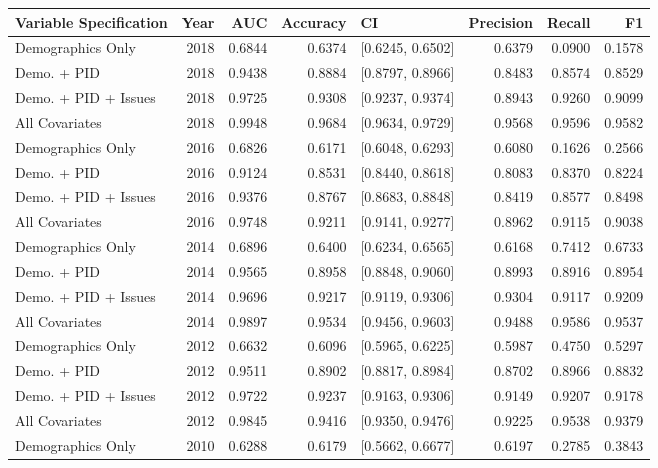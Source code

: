\begin{table}[ht]
\centering
\begin{tabular}{lrrrlrrr}
  \toprule
Variable Specification & Year & AUC & Accuracy & CI & Precision & Recall & F1 \\ 
  \midrule
Demographics Only & 2018 & 0.6844 & 0.6374 & [0.6245, 0.6502] & 0.6379 & 0.0900 & 0.1578 \\ 
  Demo. + PID & 2018 & 0.9438 & 0.8884 & [0.8797, 0.8966] & 0.8483 & 0.8574 & 0.8529 \\ 
  Demo. + PID + Issues & 2018 & 0.9725 & 0.9308 & [0.9237, 0.9374] & 0.8943 & 0.9260 & 0.9099 \\ 
  All Covariates & 2018 & 0.9948 & 0.9684 & [0.9634, 0.9729] & 0.9568 & 0.9596 & 0.9582 \\ 
  Demographics Only & 2016 & 0.6826 & 0.6171 & [0.6048, 0.6293] & 0.6080 & 0.1626 & 0.2566 \\ 
  Demo. + PID & 2016 & 0.9124 & 0.8531 & [0.8440, 0.8618] & 0.8083 & 0.8370 & 0.8224 \\ 
  Demo. + PID + Issues & 2016 & 0.9376 & 0.8767 & [0.8683, 0.8848] & 0.8419 & 0.8577 & 0.8498 \\ 
  All Covariates & 2016 & 0.9748 & 0.9211 & [0.9141, 0.9277] & 0.8962 & 0.9115 & 0.9038 \\ 
  Demographics Only & 2014 & 0.6896 & 0.6400 & [0.6234, 0.6565] & 0.6168 & 0.7412 & 0.6733 \\ 
  Demo. + PID & 2014 & 0.9565 & 0.8958 & [0.8848, 0.9060] & 0.8993 & 0.8916 & 0.8954 \\ 
  Demo. + PID + Issues & 2014 & 0.9696 & 0.9217 & [0.9119, 0.9306] & 0.9304 & 0.9117 & 0.9209 \\ 
  All Covariates & 2014 & 0.9897 & 0.9534 & [0.9456, 0.9603] & 0.9488 & 0.9586 & 0.9537 \\ 
  Demographics Only & 2012 & 0.6632 & 0.6096 & [0.5965, 0.6225] & 0.5987 & 0.4750 & 0.5297 \\ 
  Demo. + PID & 2012 & 0.9511 & 0.8902 & [0.8817, 0.8984] & 0.8702 & 0.8966 & 0.8832 \\ 
  Demo. + PID + Issues & 2012 & 0.9722 & 0.9237 & [0.9163, 0.9306] & 0.9149 & 0.9207 & 0.9178 \\ 
  All Covariates & 2012 & 0.9845 & 0.9416 & [0.9350, 0.9476] & 0.9225 & 0.9538 & 0.9379 \\ 
  Demographics Only & 2010 & 0.6288 & 0.6179 & [0.5662, 0.6677] & 0.6197 & 0.2785 & 0.3843 \\ 

\end{tabular}
\end{table}
